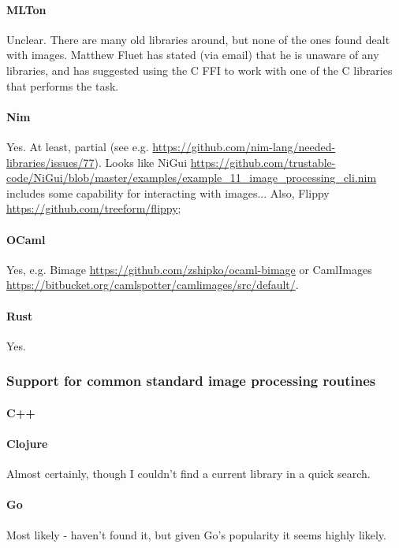 \paragraph{MLTon}
Unclear.  There are many old libraries around, but none of the ones found dealt with images.  Matthew Fluet has stated (via email) that he is unaware of any libraries, and has suggested using the C FFI to work with one of the C libraries that performs the task.

\paragraph{Nim}
Yes.  At least, partial (see e.g. \url{https://github.com/nim-lang/needed-libraries/issues/77}).  Looks like NiGui \url{https://github.com/trustable-code/NiGui/blob/master/examples/example_11_image_processing_cli.nim} includes some capability for interacting with images...  Also, Flippy \url{https://github.com/treeform/flippy}; 

\paragraph{OCaml}
Yes, e.g. Bimage \url{https://github.com/zshipko/ocaml-bimage} or CamlImages \url{https://bitbucket.org/camlspotter/camlimages/src/default/}.

\paragraph{Rust}
Yes.

\subsubsection{Support for common standard image processing routines}

\paragraph{C++}

\paragraph{Clojure}
Almost certainly, though I couldn't find a current library in a quick search.

\paragraph{Go}
Most likely - haven't found it, but given Go's popularity it seems highly likely.

